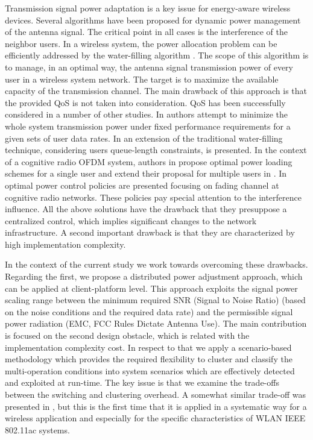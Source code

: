 Transmission signal power adaptation is a key issue for energy-aware wireless devices. Several algorithms have been proposed for dynamic power management of the antenna signal. The critical point in all cases is the interference of the neighbor users. In a wireless system, the power allocation problem can be efficiently addressed by the water-filling algorithm \cite{7}. The scope of this algorithm is to manage, in an optimal way, the antenna signal transmission power of every user in a wireless system network. The target is to maximize the available capacity of the transmission channel. The main drawback of this approach is that the provided QoS is not taken into consideration. QoS has been successfully considered in a number of other studies. In \cite{8} authors attempt to minimize the whole system transmission power under fixed performance requirements for a given sets of user data rates. In \cite{9} an extension of the traditional water-filling technique, considering users queue-length constraints, is presented. In the context of a cognitive radio OFDM system, authors in \cite{10} propose optimal power loading schemes for a single user and extend their proposal for multiple users in \cite{11}. In \cite{12} optimal power control policies are presented focusing on fading channel at cognitive radio networks. These policies pay special attention to the interference influence. All the above solutions have the drawback that they presuppose a centralized control, which implies significant changes to the network infrastructure. A second important drawback is that they are characterized by high implementation complexity.

In the context of the current study we work towards overcoming these drawbacks. Regarding the first, we propose a distributed power adjustment approach, which can be applied at client-platform level. This approach exploits the signal power scaling range between the minimum required SNR (Signal to Noise Ratio) (based on the noise conditions and the required data rate) and the permissible signal power radiation (EMC, FCC Rules Dictate Antenna Use). The main contribution is focused on the second design obstacle, which is related with the implementation complexity cost. In respect to that we apply a scenario-based methodology which provides the required flexibility to cluster and classify the multi-operation conditions into system scenarios which are effectively detected and exploited at run-time. The key issue is that we examine the trade-offs between the switching and clustering overhead. A somewhat similar trade-off was presented in \cite{24}, but this is the first time that it is applied in a systematic way for a wireless application and especially for the specific characteristics of WLAN IEEE 802.11ac systems.

